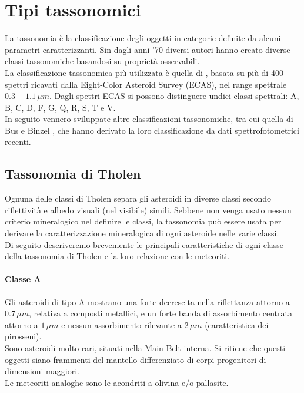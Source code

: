 \documentclass[a4paper,11pt,openright]{book}
\begin{document}
\section{Tipi tassonomici}
La tassonomia è la classificazione degli oggetti in categorie definite da alcuni parametri caratterizzanti. Sin dagli anni '70 diversi autori hanno creato diverse classi tassonomiche basandosi su proprietà osservabili.\\
La classificazione tassonomica più utilizzata è quella di \citet{tholen_asteroid_1984}, basata su più di 400 spettri ricavati dalla Eight-Color Asteroid Survey (ECAS), nel range spettrale $0.3-1.1\,\mu m$. Dagli spettri ECAS si possono distinguere undici classi spettrali: A, B, C, D, F, G, Q, R, S, T e V.\\
In seguito vennero sviluppate altre classificazioni tassonomiche, tra cui quella di Bus e Binzel \citep{bus_phase_2002-1, bus_phase_2002}, che hanno derivato la loro classificazione da dati spettrofotometrici recenti.

\subsection{Tassonomia di Tholen}
Ognuna delle classi di Tholen separa gli asteroidi in diverse classi secondo riflettività e albedo visuali (nel visibile) simili. Sebbene non venga usato nessun criterio mineralogico nel definire le classi, la tassonomia può essere usata per derivare la caratterizzazione mineralogica di ogni asteroide nelle varie classi.\\
Di seguito descriveremo brevemente le principali caratteristiche di ogni classe della tassonomia di Tholen e la loro relazione con le meteoriti. 

\paragraph*{Classe A}
Gli asteroidi di tipo A mostrano una forte decrescita nella riflettanza attorno a $0.7\,\mu m$, relativa a composti metallici, e un forte banda di assorbimento centrata attorno a $1\,\mu m$ e nessun assorbimento rilevante a $2\,\mu m$ (caratteristica dei pirosseni).\\
Sono asteroidi molto rari, situati nella Main Belt interna. Si ritiene che questi oggetti siano frammenti del mantello differenziato di corpi progenitori di dimensioni maggiori.\\
Le meteoriti analoghe sono le acondriti a olivina e/o pallasite.
\end{document}

